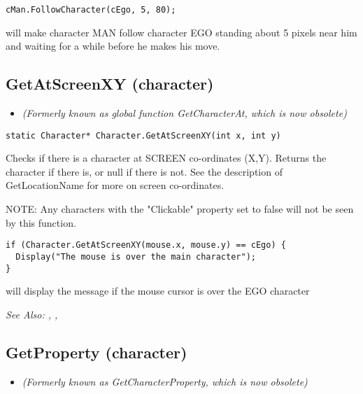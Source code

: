 \begin{verbatim}
cMan.FollowCharacter(cEgo, 5, 80);
\end{verbatim}
will make character MAN follow character EGO standing about 5 pixels near
him and waiting for a while before he makes his move.


\subsection{GetAtScreenXY (character)}\label{Character.GetAtScreenXY}%

\begin{itemize}
\item \it{(Formerly known as global function GetCharacterAt, which is now obsolete)}
\end{itemize}

\begin{verbatim}
static Character* Character.GetAtScreenXY(int x, int y)
\end{verbatim}
Checks if there is a character at SCREEN co-ordinates (X,Y).
Returns the character if there is, or null if there is not.
See the description of GetLocationName for more on screen co-ordinates.

NOTE: Any characters with the "Clickable" property set to false will not be seen
by this function.

\begin{verbatim}
if (Character.GetAtScreenXY(mouse.x, mouse.y) == cEgo) {
  Display("The mouse is over the main character");
}
\end{verbatim}
will display the message if the mouse cursor is over the EGO character

\it{See Also:} ,
,


\subsection{GetProperty (character)}\label{Character.GetProperty}%

\begin{itemize}
\item \it{(Formerly known as GetCharacterProperty, which is now obsolete)}
\end{itemize}

